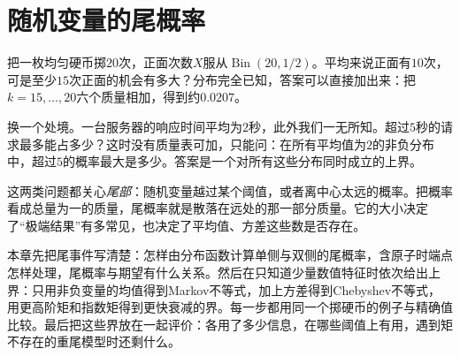 \chapter{随机变量的尾概率}
\label{chap:tail-probabilities}

把一枚均匀硬币掷$20$次，正面次数$X$服从$\operatorname{Bin}(20,1/2)$。平均来说正面有$10$次，可是至少$15$次正面的机会有多大？分布完全已知，答案可以直接加出来：把$k=15,\dots,20$六个质量相加，得到约$0.0207$。

换一个处境。一台服务器的响应时间平均为$2$秒，此外我们一无所知。超过$5$秒的请求最多能占多少？这时没有质量表可加，只能问：在所有平均值为$2$的非负分布中，超过$5$的概率最大是多少。答案是一个对所有这些分布同时成立的上界。

这两类问题都关心\emph{尾部}：随机变量越过某个阈值，或者离中心太远的概率。把概率看成总量为一的质量，尾概率就是散落在远处的那一部分质量。它的大小决定了“极端结果”有多常见，也决定了平均值、方差这些数是否存在。

本章先把尾事件写清楚：怎样由分布函数计算单侧与双侧的尾概率，含原子时端点怎样处理，尾概率与期望有什么关系。然后在只知道少量数值特征时依次给出上界：只用非负变量的均值得到Markov不等式，加上方差得到Chebyshev不等式，用更高阶矩和指数矩得到更快衰减的界。每一步都用同一个掷硬币的例子与精确值比较。最后把这些界放在一起评价：各用了多少信息，在哪些阈值上有用，遇到矩不存在的重尾模型时还剩什么。














